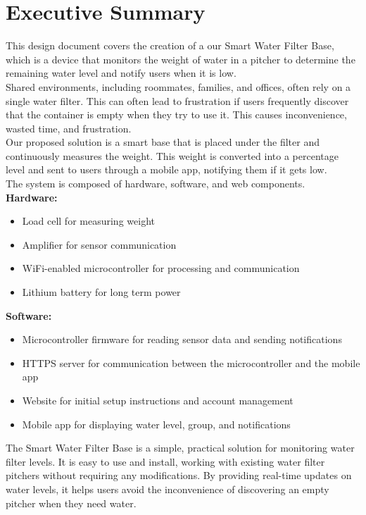 \section*{Executive Summary}

This design document covers the creation of a our Smart Water Filter Base, which is a device that monitors the weight of water in a pitcher to determine the remaining water level and notify users when it is low.\\

Shared environments, including roommates, families, and offices, often rely on a single water filter. This can often lead to frustration if users frequently discover that the container is empty when they try to use it. This causes inconvenience, wasted time, and frustration.\\

Our proposed solution is a smart base that is placed under the filter and continuously measures the weight. This weight is converted into a percentage level and sent to users through a mobile app, notifying them if it gets low. \\


\noindent{}The system is composed of hardware, software, and web components.\\

\noindent{}\textbf{Hardware:} 
\begin{itemize}
    \item Load cell for measuring weight
    \item Amplifier for sensor communication
    \item WiFi-enabled microcontroller for processing and communication
    \item Lithium battery for long term power\\
\end{itemize}

\noindent{}\textbf{Software:} 
\begin{itemize}
    \item Microcontroller firmware for reading sensor data and sending notifications
    \item HTTPS server for communication between the microcontroller and the mobile app
    \item Website for initial setup instructions and account management
    \item Mobile app for displaying water level, group, and notifications\\
\end{itemize}

The Smart Water Filter Base is a simple, practical solution for monitoring water filter levels. It is easy to use and install, working with existing water filter pitchers without requiring any modifications. By providing real-time updates on water levels, it helps users avoid the inconvenience of discovering an empty pitcher when they need water.